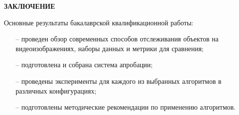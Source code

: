 \newpage
\begin{flushleft}
  \textbf{\large ЗАКЛЮЧЕНИЕ}
\end{flushleft}


Основные результаты бакалаврской квалификационной работы:
\begin{itemize}
  \item[--] проведен обзор современных способов отслеживания объектов на видеоизображениях, наборы данных и метрики для сравнения;
  \item[--] подготовлена и собрана система апробации;
  \item[--] проведены эксперименты для каждого из выбранных алгоритмов в различных конфигурациях;
  \item[--] подготовлены методические рекомендации по применению алгоритмов.
\end{itemize}
